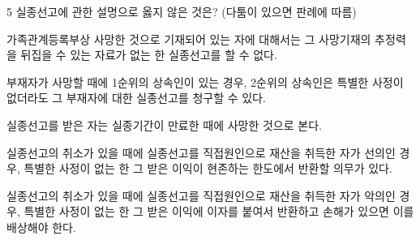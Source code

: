 \begin{question}{5}
실종선고에 관한 설명으로 옳지 않은 것은? (다툼이 있으면 판례에 따름)
\begin{choices}
  \item 가족관계등록부상 사망한 것으로 기재되어 있는 자에 대해서는 그 사망기재의 추정력을 뒤집을 수 있는 자료가 없는 한 실종선고를 할 수 없다.
  \item 부재자가 사망할 때에 1순위의 상속인이 있는 경우, 2순위의 상속인은 특별한 사정이 없더라도 그 부재자에 대한 실종선고를 청구할 수 있다.
  \item 실종선고를 받은 자는 실종기간이 만료한 때에 사망한 것으로 본다.
  \item 실종선고의 취소가 있을 때에 실종선고를 직접원인으로 재산을 취득한 자가 선의인 경우, 특별한 사정이 없는 한 그 받은 이익이 현존하는 한도에서 반환할 의무가 있다.
  \item 실종선고의 취소가 있을 때에 실종선고를 직접원인으로 재산을 취득한 자가 악의인 경우, 특별한 사정이 없는 한 그 받은 이익에 이자를 붙여서 반환하고 손해가 있으면 이를 배상해야 한다.
\end{choices}
\end{question}
